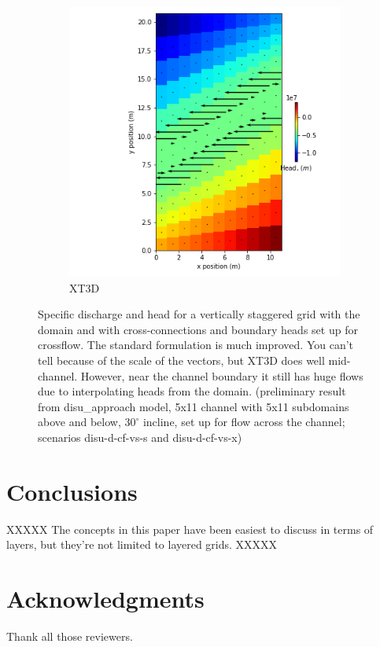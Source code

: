 \documentclass{article}
\begin{document}
\begin{figure}[H]
\begin{subfigure}{0.4\textwidth}
	\includegraphics[width=\textwidth]{../figures/disu-d-cf-vs-x-head.png}
	\caption{XT3D}
	\label{fig:disu-x-cc-cf-head}
\end{subfigure}
\caption{Specific discharge and head for a vertically staggered grid with the domain and with cross-connections and boundary heads set up for crossflow. The standard formulation is much improved. You can't tell because of the scale of the vectors, but XT3D does well mid-channel. However, near the channel boundary it still has huge flows due to interpolating heads from the domain. (preliminary result from disu\_approach model, 5x11 channel with 5x11 subdomains above and below, $30^{\circ}$ incline, set up for flow across the channel; scenarios disu-d-cf-vs-s and disu-d-cf-vs-x)}
\label{fig:figures}
\end{figure}

\section{Conclusions}

XXXXX The concepts in this paper have been easiest to discuss in terms of layers, but they're not limited to layered grids. XXXXX

\section{Acknowledgments}
Thank all those reviewers.
\end{document}

